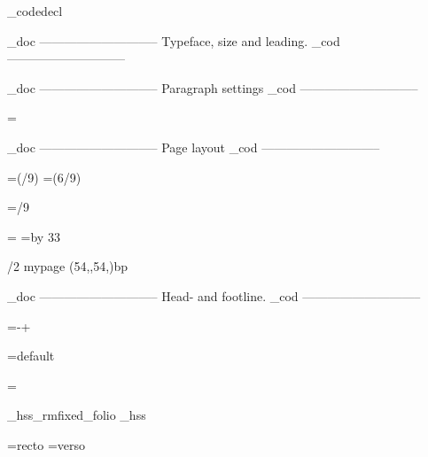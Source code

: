 \_codedecl 

    \_doc -----------------------------
    Typeface, size and leading.
    \_cod -----------------------------

\fontfam[ebgaramond]
\typosize[11/14]

    \_doc -----------------------------
    Paragraph settings
    \_cod -----------------------------

\parskip=0pt
\parindent=\baselineskip

\relax
{}\relax


    \_doc -----------------------------
    Page layout
    \_cod -----------------------------



\newdimen\pagewidth     \pagewidth=6in
\newdimen\spinemargin   \spinemargin=\dimexpr(\pagewidth/9)\relax
\newdimen\measure       \measure=\dimexpr(6\pagewidth/9)

\newdimen\pageheight    \pageheight=9in 
\newdimen\depth         \depth=6in     
\newdimen\topmargin     \topmargin=/9\relax
                        \baselineskip
                        \baselineskip

%

\hsize=\measure
\vsize=\topskip \advance\vsize by 33\baselineskip %

\margins/2 mypage (54,,54,)bp

    \_doc -----------------------------
    Head- and footline.
    \_cod -----------------------------

\headlinedist=\dimexpr\baselineskip-\topskip+\baselineskip\relax

\newif\ifheadline \headlinetrue

\headline={default}

\newif\iffootline \footlinetrue

\footline={%
    \iffootline
        \ifodd\pageno
            \_hss\_rmfixed\currvar \_folio \_hss%
        \else
            \_hss\_rmfixed\setff{+onum,+pnum}\currvar \_folio \_hss%
        \fi
    \else
        \global\footlinetrue
    \fi
}

\newtoks\rectoheadtext  \rectoheadtext={recto}
\newtoks\versoheadtext  \versoheadtext={verso}

